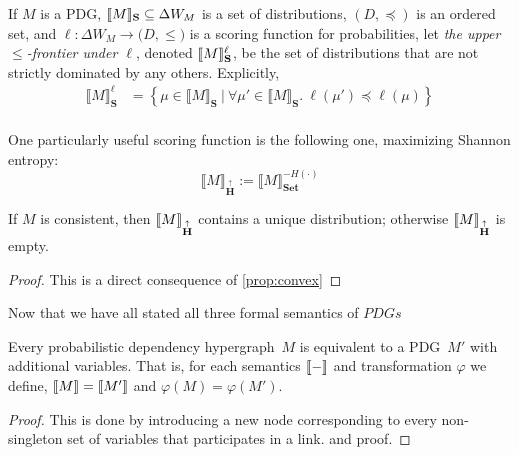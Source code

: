 \documentclass{article}
\newcommand\Set{\textbf{Set}}
\newcommand\MaxEnt{{\overset{\uparrow}{\mathbf H}}}
\newcommand{\modelnamehyper}{probabilistic dependency hypergraph}
\newcommand{\MN}{PDG}
\newcommand{\MNs}{\MN s}
\begin{document}
	\begin{defn}
		If  $M$ is a \MN, $\llbracket M\rrbracket_{\mathbf S} \subseteq \Delta W_{M}$ is a set of distributions, $(D, \preceq)$ is an ordered set, and $\ell : \Delta W_{M} \to \mathbb (D, \leq)$ is a scoring function for probabilities, let \emph{the upper $\leq$-frontier under $\ell$}, denoted $\llbracket M\rrbracket_{\mathbf S}^\ell$, be the set of distributions that are not strictly dominated by any others. Explicitly,
		\begin{align*}
			\llbracket M \rrbracket_{\mathbf S}^\ell &=  \left\{\mu \in \llbracket M \rrbracket_{\mathbf S} ~\Big|~ \forall \mu' \in \llbracket M \rrbracket_{\mathbf S}.~ \ell(\mu') \preceq \ell(\mu)  \right\} \\
		\end{align*}
	\end{defn}
	One particularly useful scoring function is the following one, maximizing Shannon entropy:
	\[ \Big\llbracket M \Big\rrbracket_\MaxEnt := \Big\llbracket M \Big\rrbracket_\Set^{-H(\cdot)} \]

	\begin{theorem} 
		If $M$ is consistent, then $\bbr{M}_\MaxEnt$ contains a unique distribution; otherwise $\bbr{M}_\MaxEnt$ is empty.
	\end{theorem}
	\begin{proof}
		\vspace{-1em}
		This is a direct consequence of \cref{prop:convex}
	\end{proof}


	
	
	Now that we have all stated all three formal semantics of $\MNs$

	
	

	\begin{theorem}[restate=thmhyperequiv]\label{thm:hyperequiv}
		Every \modelnamehyper\ $M$ is equivalent to a \MN\ $M'$ with additional variables. That is, for each semantics $\llbracket-\rrbracket$ and transformation $\varphi$ we define, $\llbracket M\rrbracket = \llbracket M'\rrbracket$ and $\varphi(M) = \varphi(M')$.
	\end{theorem}
	\begin{proof}
		This is done by introducing a new node corresponding to every non-singleton set of variables that participates in a link.  and proof.
	\end{proof}
	
\end{document}
